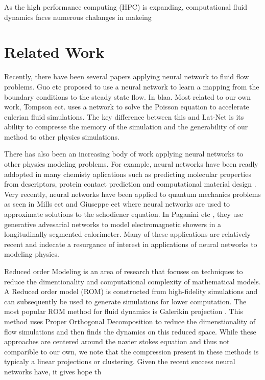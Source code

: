 \documentclass{article}
\begin{document}
As the high performance computing (HPC) is expanding, computational fluid dynamics faces numerous chalanges in makeing 


\section{Related Work}

Recently, there have been several papers applying neural network to fluid flow problems. Guo etc \cite{guo2016convolutional} proposed to use a neural network to learn a mapping from the boundary conditions to the steady state flow. In \cite{yang2016data} blaa. Most related to our own work, Tompson ect. \cite{tompson2016accelerating} uses a network to solve the Poisson equation to accelerate eulerian fluid simulations. The key difference between this and Lat-Net is its ability to compresse the memory of the simulation and the generability of our method to other physics simulations.

There has also been an increasing body of work applying neural networks to other physics modeling problems. For example, neural networks have been readly addopted in many chemisty aplications such as predicting molecular properties from descriptors, protein contact prediction and computational material design \cite{goh2017deep}. Very recently, neural networks have been applied to quantum mechanics problems as seen in Mills ect \cite{mills2017deep} and Giuseppe ect \cite{carleo2017solving} where neural networks are used to approximate solutions to the schodiener equation. In Paganini etc \cite{2017arXiv170502355P}, they use generative advesarial networks \cite{goodfellow2014generative} to model electromagnetic showers in a longitudinally segmented calorimeter. Many of these applications are relatively recent and indecate a resurgance of interest in applications of neural networks to modeling physics.

Reduced order Modeling is an area of research that focuses on techniques to reduce the dimentionality and computational complexity of mathematical models. A Reduced order model (ROM) is constructed from high-fidelity simulations and can subsequently be used to generate simulations for lower computation. The most popular ROM method for fluid dynamics is Galerikin projection \cite{barone2009reduced}. This method uses Proper Orthogonal Decomposition to reduce the dimenstionality of flow simulations and then finds the dynamics on this reduced space.  
While these approaches are centered around the navier stokes equation and thus not comparible to our own, we note that the compression present in these methods is typicaly a linear projections or clustering. Given the recent success neural networks have, it gives hope th
\end{document}
